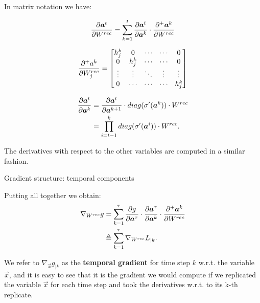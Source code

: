 \begin{frame}
	In matrix notation we have:
	
	\begin{equation}
	\frac{\partial \boldsymbol{a}^t}{\partial W^{rec}} = \sum_{k=1}^t \frac{\partial \boldsymbol{a}^t}{\partial \boldsymbol{a}^k} \cdot \frac{\partial^+ \boldsymbol{a}^k}{\partial W^{rec}}
	\end{equation}
	
	
	\begin{equation}
	\frac{\partial^+ a^{k}}{\partial W_j^{rec}} =
	\begin{bmatrix}
	h_j^{k}    & 0                & \cdots      & \cdots       & 0  \\
	0               & h_j^{k}     & \cdots      & \cdots       & 0  \\
	\vdots          & \vdots           & \ddots      & \vdots       &\vdots\\
	0               & \cdots           & \cdots      & \cdots       & h^{k}_{j}
	\end{bmatrix}
	\end{equation}
	
	\begin{align}
	\frac{\partial \boldsymbol{a}^t}{\partial \boldsymbol{a}^k} &= \frac{\partial \boldsymbol{a}^t}{\partial \boldsymbol{a}^{k+1}} \cdot diag(\sigma'(\boldsymbol{a}^k)) \cdot W^{rec} \\
	&= \prod_{i=t-1}^{k} diag(\sigma'(\boldsymbol{a}^i)) \cdot W^{rec}
	\label{rnn_delta}.
	\end{align}
	
	The derivatives with respect to the other variables are computed in a similar fashion.
	
	
\end{frame}

\begin{frame}{Gradient structure: temporal components}
	
	Putting all together we obtain:
	\begin{align}
	\nabla_{W^{rec}} g  &= \sum_{k=1}^{\tau} \frac{\partial g}{\partial \boldsymbol{a}^{\tau}} \cdot \frac{\partial \boldsymbol{a}^{\tau}}{\partial \boldsymbol{a}^k} \cdot \frac{\partial^+ \boldsymbol{a}^k}{\partial W^{rec}}\\
	&\triangleq \sum_{k=1}^{\tau} \nabla_{W^{rec}} L_{|k}.
	\end{align}
	
	We refer to $\nabla_{\vec{x}} g_{|k}$ as the \textbf{temporal gradient} for time step $k$ w.r.t. the variable $\vec{x}$, and it is easy to see that it is the gradient we would compute if we replicated the variable $\vec{x}$ for each time step and took the derivatives w.r.t. to its k-th replicate.
\end{frame}